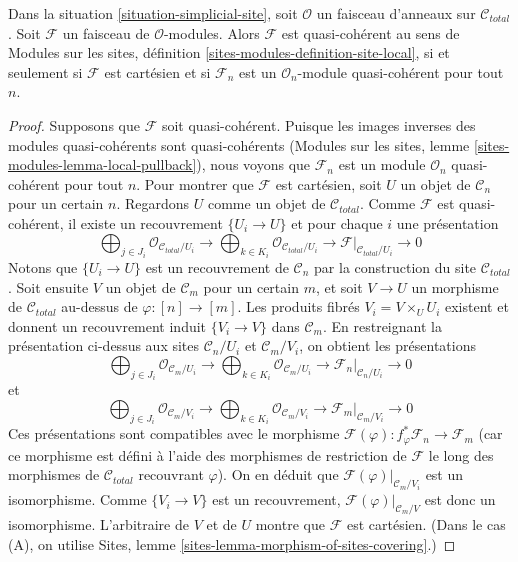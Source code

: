 \begin{lemma}
\label{lemma-quasi-coherent-sheaf}
Dans la situation \ref{situation-simplicial-site},
soit $\mathcal{O}$ un faisceau d'anneaux sur $\mathcal{C}_{total}$.
Soit $\mathcal{F}$ un faisceau de $\mathcal{O}$-modules.
Alors $\mathcal{F}$ est quasi-cohérent au sens de
Modules sur les sites, définition \ref{sites-modules-definition-site-local},
si et seulement si $\mathcal{F}$ est cartésien
et si $\mathcal{F}_n$ est un $\mathcal{O}_n$-module quasi-cohérent pour tout $n$.
\end{lemma}

\begin{proof}
Supposons que $\mathcal{F}$ soit quasi-cohérent. Puisque les images inverses des modules quasi-cohérents
sont quasi-cohérents
(Modules sur les sites, lemme \ref{sites-modules-lemma-local-pullback}),
nous voyons que $\mathcal{F}_n$ est un module $\mathcal{O}_n$ quasi-cohérent
pour tout $n$. Pour montrer que $\mathcal{F}$ est cartésien, soit $U$
un objet de $\mathcal{C}_n$ pour un certain $n$. Regardons $U$
comme un objet de $\mathcal{C}_{total}$. Comme $\mathcal{F}$
est quasi-cohérent, il existe un recouvrement $\{U_i \to U\}$
et pour chaque $i$ une présentation
$$
\bigoplus\nolimits_{j \in J_i} \mathcal{O}_{\mathcal{C}_{total}/U_i} \to
\bigoplus\nolimits_{k \in K_i} \mathcal{O}_{\mathcal{C}_{total}/U_i} \to
\mathcal{F}|_{\mathcal{C}_{total}/U_i} \to 0
$$
Notons que $\{U_i \to U\}$ est un recouvrement de $\mathcal{C}_n$ par
la construction du site $\mathcal{C}_{total}$.
Soit ensuite $V$ un objet de $\mathcal{C}_m$ pour un certain $m$, et soit
$V \to U$ un morphisme de $\mathcal{C}_{total}$ au-dessus de
$\varphi : [n] \to [m]$. Les produits fibrés $V_i = V \times_U U_i$
existent et donnent un recouvrement induit $\{V_i \to V\}$ dans $\mathcal{C}_m$.
En restreignant la présentation ci-dessus aux sites
$\mathcal{C}_n/U_i$ et $\mathcal{C}_m/V_i$, on obtient
les présentations
$$
\bigoplus\nolimits_{j \in J_i} \mathcal{O}_{\mathcal{C}_m/U_i} \to
\bigoplus\nolimits_{k \in K_i} \mathcal{O}_{\mathcal{C}_m/U_i} \to
\mathcal{F}_n|_{\mathcal{C}_n/U_i} \to 0
$$
et
$$
\bigoplus\nolimits_{j \in J_i} \mathcal{O}_{\mathcal{C}_m/V_i} \to
\bigoplus\nolimits_{k \in K_i} \mathcal{O}_{\mathcal{C}_m/V_i} \to
\mathcal{F}_m|_{\mathcal{C}_m/V_i} \to 0
$$
Ces présentations sont compatibles avec le morphisme
$\mathcal{F}(\varphi) : f_\varphi^*\mathcal{F}_n \to \mathcal{F}_m$
(car ce morphisme est défini à l'aide des morphismes de restriction de $\mathcal{F}$
le long des morphismes de $\mathcal{C}_{total}$ recouvrant $\varphi$).
On en déduit que $\mathcal{F}(\varphi)|_{\mathcal{C}_m/V_i}$
est un isomorphisme. Comme $\{V_i \to V\}$ est un recouvrement,
$\mathcal{F}(\varphi)|_{\mathcal{C}_m/V}$ est donc un isomorphisme.
L'arbitraire de $V$ et de $U$ montre que $\mathcal{F}$ est cartésien.
(Dans le cas (A), on utilise Sites, lemme \ref{sites-lemma-morphism-of-sites-covering}.)


\end{proof}
